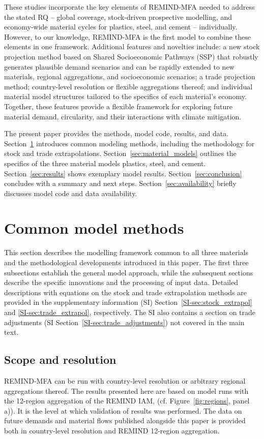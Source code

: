 \documentclass[pdflatex]{sn-jnl}
\begin{document}
These studies incorporate the key elements of REMIND-MFA needed to address the stated RQ – global coverage, stock-driven prospective modelling, and economy-wide material cycles for plastics, steel, and cement – individually. However, to our knowledge, REMIND-MFA is the first model to combine these elements in one framework. Additional features and novelties include: a new stock projection method based on Shared Socioeconomic Pathways (SSP) \parencite{oneillRoadsAheadNarratives2017a} that robustly generates plausible demand scenarios and can be rapidly extended to new materials, regional aggregations, and socioeconomic scenarios; a trade projection method; country-level resolution or flexible aggregations thereof; and individual material model structures tailored to the specifics of each material’s economy. Together, these features provide a flexible framework for exploring future material demand, circularity, and their interactions with climate mitigation.

The present paper provides the methods, model code, results, and data. Section~\ref{sec:methods} introduces common modeling methods, including the methodology for stock and trade extrapolations. Section~\ref{sec:material_models} outlines the specifics of the three material models plastics, steel, and cement. Section~\ref{sec:results} shows exemplary model results. Section~\ref{sec:conclusion} concludes with a summary and next steps. Section~\ref{sec:availability} briefly discusses model code and data availability.

\section{Common model methods}\label{sec:methods}
This section describes the modelling framework common to all three materials and the methodological developments introduced in this paper. The first three subsections establish the general model approach, while the subsequent sections describe the specific innovations and the processing of input data. Detailed descriptions with equations on the stock and trade extrapolation methods are provided in the supplementary information (SI) Section~\ref{SI-sec:stock_extrapol} and \ref{SI-sec:trade_extrapol}, respectively. The SI also contains a section on trade adjustments (SI Section~\ref{SI-sec:trade_adjustments}) not covered in the main text.

\subsection{Scope and resolution}\label{sec:scope}
REMIND-MFA can be run with country-level resolution or arbitrary regional aggregations thereof. The results presented here are based on model runs with the 12-region aggregation of the REMIND IAM, (cf. Figure~\ref{fig:regions}, panel a)). It is the level at which validation of results was performed. The data on future demands and material flows published alongside this paper is provided both in country-level resolution and REMIND 12-region aggregation.
\end{document}
